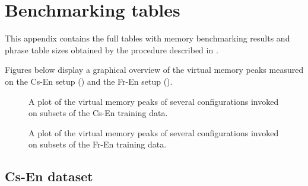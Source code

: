 \chapter{Benchmarking tables}
\label{chap:benchmarking-tables}

This appendix contains the full tables with memory benchmarking results and
phrase table sizes obtained by the procedure described in .

Figures below display a graphical overview of the virtual memory peaks measured on the Cs-En setup
() and the Fr-En setup ().

\begin{figure}[!htb]
  \centering
  
  \caption{
    A plot of the virtual memory peaks of several \eppex{} configurations invoked on subsets of the Cs-En training data.
  }
  \label{fig:cs-en-vm-peaks-summary}
\end{figure}

\begin{figure}[!htb]
  \centering
  
  \caption{
    A plot of the virtual memory peaks of several \eppex{} configurations invoked on subsets of the Fr-En training data.
  }
  \label{fig:fr-en-vm-peaks-summary}
\end{figure}

\openright
\section{Cs-En dataset}

